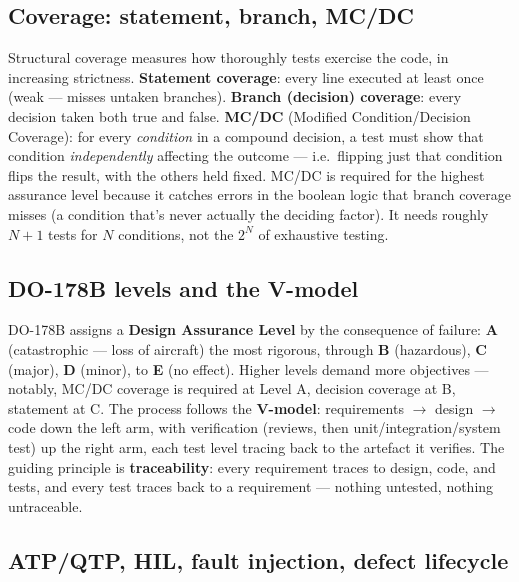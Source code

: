 \subsection{Coverage: statement, branch, MC/DC}

Structural coverage measures how thoroughly tests exercise the code, in
increasing strictness. \textbf{Statement coverage}: every line executed at least
once (weak --- misses untaken branches). \textbf{Branch (decision) coverage}:
every decision taken both true and false. \textbf{MC/DC} (Modified
Condition/Decision Coverage): for every \emph{condition} in a compound decision,
a test must show that condition \emph{independently} affecting the outcome ---
i.e.\ flipping just that condition flips the result, with the others held fixed.
MC/DC is required for the highest assurance level because it catches errors in
the boolean logic that branch coverage misses (a condition that's never actually
the deciding factor). It needs roughly $N+1$ tests for $N$ conditions, not the
$2^N$ of exhaustive testing.

\subsection{DO-178B levels and the V-model}

DO-178B assigns a \textbf{Design Assurance Level} by the consequence of failure:
\textbf{A} (catastrophic --- loss of aircraft) the most rigorous, through
\textbf{B} (hazardous), \textbf{C} (major), \textbf{D} (minor), to \textbf{E}
(no effect). Higher levels demand more objectives --- notably, MC/DC coverage is
required at Level A, decision coverage at B, statement at C. The process follows
the \textbf{V-model}: requirements $\rightarrow$ design $\rightarrow$ code down
the left arm, with verification (reviews, then unit/integration/system test) up
the right arm, each test level tracing back to the artefact it verifies. The
guiding principle is \textbf{traceability}: every requirement traces to design,
code, and tests, and every test traces back to a requirement --- nothing
untested, nothing untraceable.

\subsection{ATP/QTP, HIL, fault injection, defect lifecycle}

